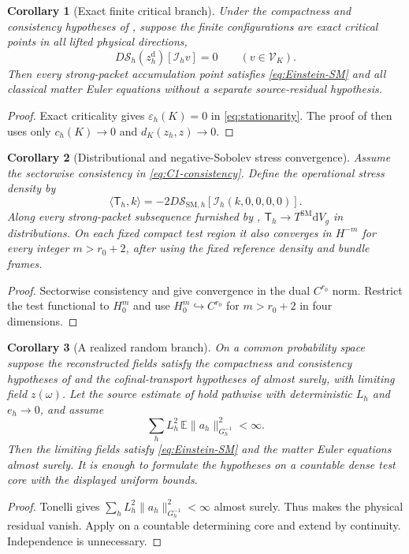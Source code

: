 \documentclass[11pt]{article}
\numberwithin{equation}{section}
\newtheorem{corollary}[corollary]{Corollary}
\theoremstyle{definition}
\theoremstyle{remark}
\newcommand{\dd}{\mathrm d}
\newcommand{\norm}[1]{\lVert#1\rVert}
\newcommand{\Sact}{\mathscr S}
\newcommand{\Vtest}{\mathscr V}
\newcommand{\dV}{\dd V}
\begin{document}
\begin{corollary}[Exact finite critical branch]
\label{cor:exact-critical}
Under the compactness and consistency hypotheses of , suppose the finite configurations are exact critical points in all lifted physical directions,
\[
 D\Sact_h(z_h^{\mathrm d})[\mathcal I_hv]=0
 \qquad(v\in\Vtest_K).
\]
Then every strong-packet accumulation point satisfies \eqref{eq:Einstein-SM} and all classical matter Euler equations without a separate source-residual hypothesis.
\end{corollary}
\begin{proof}
Exact criticality gives $\varepsilon_h(K)=0$ in \eqref{eq:stationarity}.  The proof of  then uses only $c_h(K)\to0$ and $d_K(z_h,z)\to0$.
\end{proof}

\begin{corollary}[Distributional and negative-Sobolev stress convergence]
\label{cor:stress-topology}
Assume the sectorwise consistency in \eqref{eq:C1-consistency}. Define the operational stress density by
\[
 \langle\mathsf T_h,k\rangle
 =-2D\Sact_{\mathrm{SM},h}[\mathcal I_h(k,0,0,0,0)].
\]
Along every strong-packet subsequence furnished by , $\mathsf T_h\to T^{\mathrm{SM}}\dV_g$ in distributions. On each fixed compact test region it also converges in $H^{-m}$ for every integer $m>r_0+2$, after using the fixed reference density and bundle frames.
\end{corollary}
\begin{proof}
Sectorwise consistency and  give convergence
in the dual $C^{r_0}$ norm. Restrict the test functional to $H_0^m$ and use
$H_0^m\hookrightarrow C^{r_0}$ for $m>r_0+2$ in four dimensions.
\end{proof}

\begin{corollary}[A realized random branch]
\label{cor:random-realization}
On a common probability space suppose the reconstructed fields satisfy the compactness and consistency hypotheses of  and the cofinal-transport hypotheses of  almost surely, with limiting field $z(\omega)$.  Let the source estimate of  hold pathwise with deterministic $L_h$ and $e_h\to0$, and assume
\[
 \sum_h L_h^2\,\mathbb E\norm{a_h}_{G_h^{-1}}^2<\infty.
\]
Then the limiting fields satisfy \eqref{eq:Einstein-SM} and the matter Euler equations almost surely. It is enough to formulate the hypotheses on a countable dense test core with the displayed uniform bounds.
\end{corollary}
\begin{proof}
Tonelli gives $\sum_hL_h^2\|a_h\|_{G_h^{-1}}^2<\infty$ almost surely.
Thus  makes the physical residual vanish.
Apply  on a countable determining
core and extend by continuity. Independence is unnecessary.
\end{proof}
\end{document}

